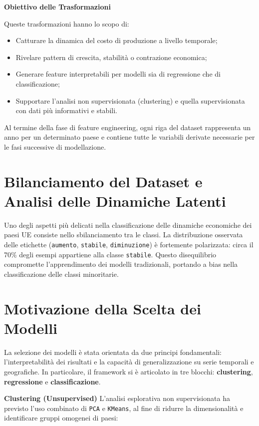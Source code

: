 \documentclass[conference]{IEEEtran}
\begin{document}
\noindent\textbf{Obiettivo delle Trasformazioni}

Queste trasformazioni hanno lo scopo di:

\begin{itemize}
    \item Catturare la dinamica del costo di produzione a livello temporale;
    \item Rivelare pattern di crescita, stabilità o contrazione economica;
    \item Generare feature interpretabili per modelli sia di regressione che di classificazione;
    \item Supportare l’analisi non supervisionata (clustering) e quella supervisionata con dati più informativi e stabili.
\end{itemize}

Al termine della fase di feature engineering, ogni riga del dataset rappresenta un anno per un determinato paese e contiene tutte le variabili derivate necessarie per le fasi successive di modellazione.


 \section*{\Large \textbf{Bilanciamento del Dataset e Analisi delle Dinamiche Latenti}}
Uno degli aspetti più delicati nella classificazione delle dinamiche economiche dei paesi UE consiste nello sbilanciamento tra le classi. La distribuzione osservata delle etichette (\texttt{aumento}, \texttt{stabile}, \texttt{diminuzione}) è fortemente polarizzata: circa il 70\% degli esempi appartiene alla classe \texttt{stabile}. Questo disequilibrio compromette l'apprendimento dei modelli tradizionali, portando a bias nella classificazione delle classi minoritarie.

\section*{\Large \textbf{Motivazione della Scelta dei Modelli}}
La selezione dei modelli è stata orientata da due principi fondamentali: l’interpretabilità dei risultati e la capacità di generalizzazione su serie temporali e geografiche. In particolare, il framework si è articolato in tre blocchi: \textbf{clustering}, \textbf{regressione} e \textbf{classificazione}.

\vspace{0.5em} \noindent\textbf{Clustering (Unsupervised)} L’analisi esplorativa non supervisionata ha previsto l’uso combinato di \texttt{PCA} e \texttt{KMeans}, al fine di ridurre la dimensionalità e identificare gruppi omogenei di paesi:
\end{document}
